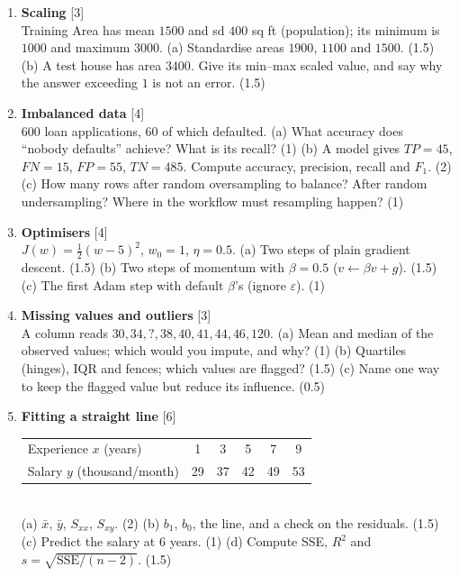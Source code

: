 \documentclass[11pt]{article}
\begin{document}
\begin{enumerate}[label=\textbf{Q\arabic*.}]
  \item \textbf{Scaling} \hfill [3]\\
    Training Area has mean $1500$ and sd $400$ sq ft (population); its minimum
    is $1000$ and maximum $3000$.
    (a) Standardise areas $1900$, $1100$ and $1500$. (1.5)
    (b) A test house has area $3400$. Give its min--max scaled value, and say
    why the answer exceeding $1$ is not an error. (1.5)
  \item \textbf{Imbalanced data} \hfill [4]\\
    600 loan applications, 60 of which defaulted.
    (a) What accuracy does ``nobody defaults'' achieve? What is its recall? (1)
    (b) A model gives $TP = 45$, $FN = 15$, $FP = 55$, $TN = 485$. Compute
    accuracy, precision, recall and $F_1$. (2)
    (c) How many rows after random oversampling to balance? After random
    undersampling? Where in the workflow must resampling happen? (1)
  \item \textbf{Optimisers} \hfill [4]\\
    $J(w) = \tfrac12(w - 5)^2$, $w_0 = 1$, $\eta = 0.5$.
    (a) Two steps of plain gradient descent. (1.5)
    (b) Two steps of momentum with $\beta = 0.5$ ($v \leftarrow \beta v + g$). (1.5)
    (c) The first Adam step with default $\beta$'s (ignore $\varepsilon$). (1)
  \item \textbf{Missing values and outliers} \hfill [3]\\
    A column reads $30, 34, ?, 38, 40, 41, 44, 46, 120$.
    (a) Mean and median of the observed values; which would you impute, and
    why? (1)
    (b) Quartiles (hinges), IQR and fences; which values are flagged? (1.5)
    (c) Name one way to keep the flagged value but reduce its influence. (0.5)
  \item \textbf{Fitting a straight line} \hfill [6]\\
    \begin{tabular}{@{}lccccc@{}}
    Experience $x$ (years) & 1 & 3 & 5 & 7 & 9\\
    Salary $y$ (thousand/month) & 29 & 37 & 42 & 49 & 53
    \end{tabular}\\
    (a) $\bar x$, $\bar y$, $S_{xx}$, $S_{xy}$. (2)
    (b) $b_1$, $b_0$, the line, and a check on the residuals. (1.5)
    (c) Predict the salary at 6 years. (1)
    (d) Compute SSE, $R^2$ and $s = \sqrt{\mathrm{SSE}/(n-2)}$. (1.5)
\end{enumerate}
\end{document}
